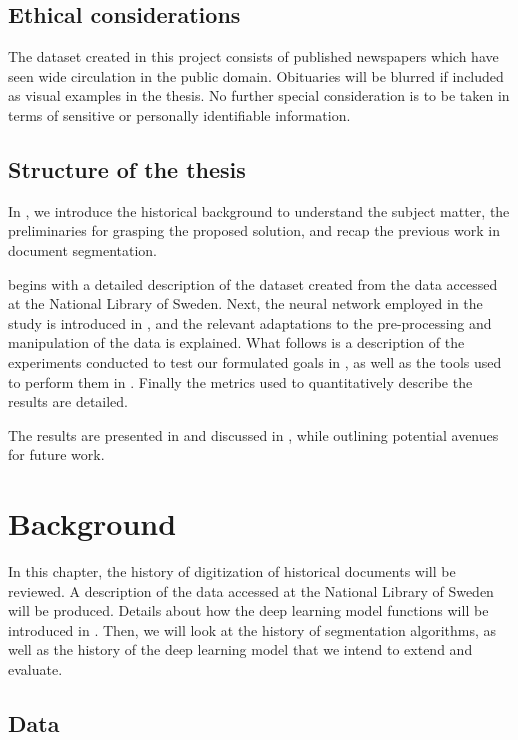 \documentclass[oneside, english, bibtex]{kththesis}
\begin{document}
\section{Ethical considerations}

The dataset created in this project consists of published newspapers which have seen wide circulation in the public domain. 
Obituaries will be blurred if included as visual examples in the thesis. No further special consideration is to be taken in terms of sensitive or personally identifiable information.

\section{Structure of the thesis}

In , we introduce the historical background to understand the subject matter, the preliminaries for grasping the proposed solution, and recap the previous work in document segmentation.

 begins with a detailed description of the dataset created from the data accessed at the National Library of Sweden.
Next, the neural network employed in the study is introduced in , and the relevant adaptations to the pre-processing and manipulation of the data is explained.
What follows is a description of the experiments conducted to test our formulated goals in , as well as the tools used to perform them in .
Finally the metrics used to quantitatively describe the results are detailed.

The results are presented in  and discussed in ,
while outlining potential avenues for future work.

\cleardoublepage
\chapter{Background}
\label{ch:background}

In this chapter, the history of digitization of historical documents will be reviewed. A description of the data accessed at the National Library of Sweden will be produced. Details about how the deep learning model functions will be introduced in . Then, we will look at the history of segmentation algorithms, as well as the history of the deep learning model that we intend to extend and evaluate. 

\section{Data}
\end{document}
